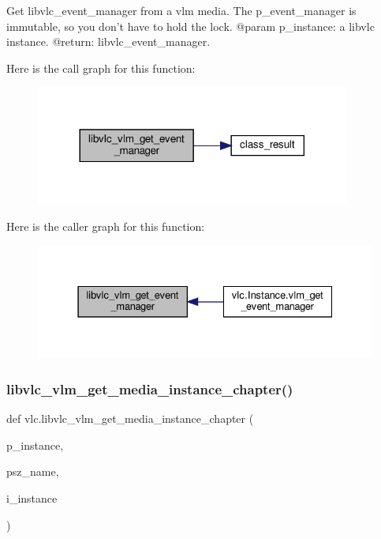 \begin{DoxyVerb}Get libvlc_event_manager from a vlm media.
The p_event_manager is immutable, so you don't have to hold the lock.
@param p_instance: a libvlc instance.
@return: libvlc_event_manager.
\end{DoxyVerb}
 Here is the call graph for this function\+:
\nopagebreak
\begin{figure}[H]
\begin{center}
\leavevmode
\includegraphics[width=293pt]{namespacevlc_aeeafd7297de31ccc1034c0e37175715f_cgraph}
\end{center}
\end{figure}
Here is the caller graph for this function\+:
\nopagebreak
\begin{figure}[H]
\begin{center}
\leavevmode
\includegraphics[width=331pt]{namespacevlc_aeeafd7297de31ccc1034c0e37175715f_icgraph}
\end{center}
\end{figure}
\mbox{\label{namespacevlc_a6f3929a65f89f072354d79c5000a8651}} 
\subsubsection{\texorpdfstring{libvlc\+\_\+vlm\+\_\+get\+\_\+media\+\_\+instance\+\_\+chapter()}{libvlc\_vlm\_get\_media\_instance\_chapter()}}
{\footnotesize\ttfamily def vlc.\+libvlc\+\_\+vlm\+\_\+get\+\_\+media\+\_\+instance\+\_\+chapter (\begin{DoxyParamCaption}\item[{}]{p\+\_\+instance,  }\item[{}]{psz\+\_\+name,  }\item[{}]{i\+\_\+instance }\end{DoxyParamCaption})}

